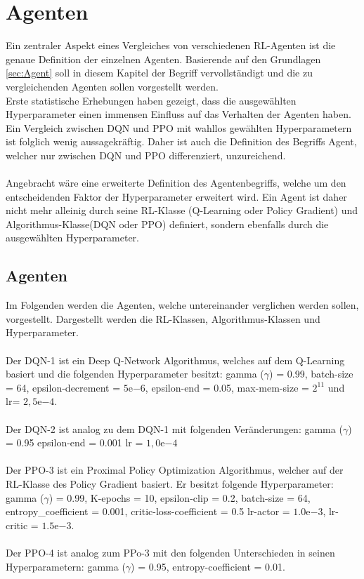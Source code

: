 \chapter{Agenten} \label{chap:Agenten}
Ein zentraler Aspekt eines Vergleiches von verschiedenen RL-Agenten ist die genaue Definition der einzelnen Agenten. Basierende auf den Grundlagen \ref{sec:Agent} soll in diesem Kapitel der Begriff vervollständigt und die zu vergleichenden Agenten sollen vorgestellt werden.\\
Erste statistische Erhebungen haben gezeigt, dass die ausgewählten Hyperparameter einen immensen Einfluss auf das Verhalten der Agenten haben. Ein Vergleich zwischen DQN und PPO mit wahllos gewählten Hyperparametern ist folglich wenig aussagekräftig. Daher ist auch die Definition des Begriffs Agent, welcher nur zwischen DQN und PPO differenziert, unzureichend.\\
\\Angebracht wäre eine erweiterte Definition des Agentenbegriffs, welche um den entscheidenden Faktor der Hyperparameter erweitert wird. Ein Agent ist daher nicht mehr alleinig durch seine RL-Klasse (Q-Learning oder Policy Gradient) und Algorithmus-Klasse(DQN oder PPO) definiert, sondern ebenfalls durch die ausgewählten Hyperparameter.

\section{Agenten}
Im Folgenden werden die Agenten, welche untereinander verglichen werden sollen, vorgestellt. Dargestellt werden die RL-Klassen, Algorithmus-Klassen und Hyperparameter.\\
\\ Der DQN-1 ist ein Deep Q-Network Algorithmus, welches auf dem Q-Learning basiert und die folgenden Hyperparameter besitzt: gamma ($\gamma$) = 0.99,
batch-size = 64, epsilon-decrement = $5\mathrm{e}{-6}$, epsilon-end = 0.05, max-mem-size = $2^{11}$ und lr= $2,5\mathrm{e}{-4}$.\\
\\Der DQN-2 ist analog zu dem DQN-1 mit folgenden Veränderungen: gamma ($\gamma$) = 0.95 epsilon-end = 0.001 lr = $1,0\mathrm{e}{-4}$\\
\\Der PPO-3 ist ein Proximal Policy Optimization Algorithmus, welcher auf der RL-Klasse des Policy Gradient basiert. Er besitzt folgende Hyperparameter: gamma ($\gamma$) = 0.99, K-epochs = 10, epsilon-clip = 0.2, batch-size = 64, entropy\_coefficient = 0.001, critic-loss-coefficient = 0.5 lr-actor = $1.0\mathrm{e}{-3}$, lr-critic = $1.5\mathrm{e}{-3}$.\\
\\Der PPO-4 ist analog zum PPo-3 mit den folgenden Unterschieden in seinen Hyperparametern: gamma ($\gamma$) = 0.95, entropy-coefficient = 0.01.